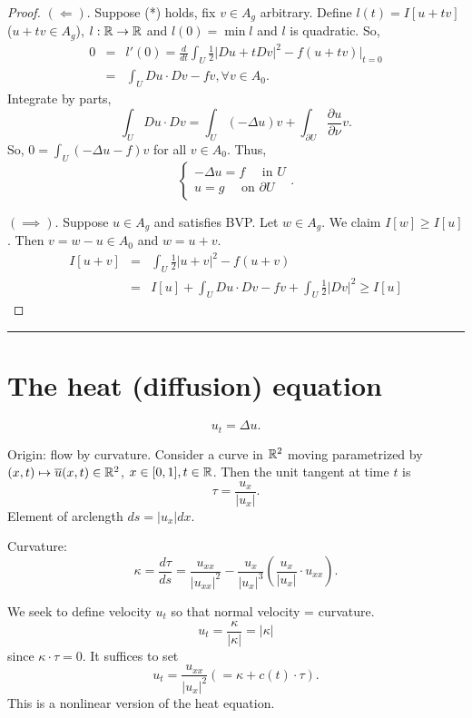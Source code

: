 \documentclass[11pt]{amsart}%
\begin{document}
\begin{proof}
    $(\Leftarrow)$. Suppose (*) holds, fix $v\in A_g$ arbitrary. Define $l(t) = I[u+tv]$ ($u+tv \in A_g$), $l:\mathbb{R}\to\mathbb{R}$ and $l(0)=\min l$ and $l$ is quadratic. So,
    \begin{eqnarray*}
        0&=&l'(0) = \frac{d}{dt}\int_U \frac{1}{2} \vert Du + tDv\vert^2 -f(u+tv) \vert_{t=0}\\
        &=& \int_U Du\cdot Dv -fv, \forall v\in A_0.
    \end{eqnarray*}
    Integrate by parts,
    $$\int_U Du\cdot Dv = \int_U(-\Delta u)v +\int_{\partial U} \frac{\partial u}{\partial \nu} v.$$
    So, $0 =\int_U(-\Delta u-f)v$ for all $v\in A_0$. Thus,
    $$\begin{cases}
        -\Delta u =f \quad \text{ in } U\\
        u=g \quad \text{ on } \partial U
    \end{cases}.$$
    
    $(\implies)$. Suppose $u\in A_g$ and satisfies BVP. Let $w\in A_g$. We claim $I[w]\ge I[u]$. Then $v=w-u\in A_0$ and $w=u+v$.
    \begin{eqnarray*}
        I[u+v] &=& \int_U\frac{1}{2}\vert u+v\vert^2 -f(u+v)\\
            &=& I[u] + \int_U Du\cdot Dv -fv +\int_U\frac{1}{2}\vert Dv\vert^2 \ge I[u]
    \end{eqnarray*}
\end{proof}

\begin{center}\rule{0.5\linewidth}{\linethickness}\end{center}

\section*{The heat (diffusion) equation}

$$u_t =\Delta u.$$

Origin: flow by curvature. Consider a curve in $\mathbb{R}^2$ moving parametrized by $(x,t)\mapsto \overline{u}(x,t)\in \mathbb{R}^2$, $x\in [0,1], t\in \mathbb{R}$. Then the unit tangent at time $t$ is
$$\tau = \frac{u_x}{\vert u_x\vert}.$$
Element of arclength $ds = \vert u_x\vert dx$.

Curvature: $$\kappa =\frac{d\tau}{ds}= \frac{u_{xx}}{\vert u_{xx}\vert^2} -\frac{u_{x}}{\vert u_x\vert^3}(\frac{u_x}{\vert u_x\vert} \cdot u_{xx}).$$

We seek to define velocity $u_t$ so that normal velocity = curvature.
$$u_t = \frac{\kappa}{\vert \kappa\vert} = \vert \kappa\vert$$ since $\kappa\cdot \tau=0$. It suffices to set $$u_t =\frac{u_{xx}}{\vert u_x\vert^2} (= \kappa +c(t)\cdot \tau).$$ This is a nonlinear version of the heat equation.
\end{document}
